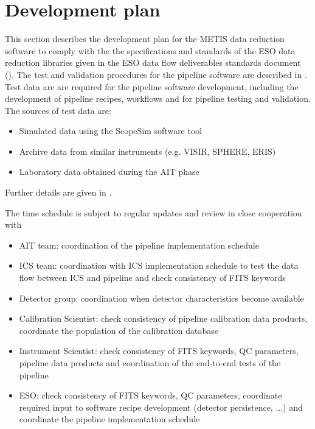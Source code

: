 \clearpage
\section{Development plan}\label{sec:development_plan}

This section describes the development plan for the METIS data reduction software to comply with the the specifications and standards of the ESO data reduction libraries given in the ESO data flow deliverables standards document (\cite{1618}). The test and validation procedures for the pipeline software are described in \cite{DRLVT}. 
Test data are are required for the pipeline software development, including the development of pipeline recipes, workflows and for pipeline testing and validation. The sources of test data are:
\begin{itemize}
    \item Simulated data using the ScopeSim software tool
    \item Archive data from similar instruments (e.g. VISIR, SPHERE, ERIS)
    \item Laboratory data obtained during the AIT phase
\end{itemize}
Further details are given in \cite{DRLVT}.

The time schedule is subject to regular updates and review in close cooperation with

\begin{itemize}
    \item \ac{AIT} team: coordination of the pipeline implementation schedule
    \item \ac{ICS} team: coordination with ICS implementation schedule to test the data flow between ICS and pipeline and check consistency of FITS keywords
    \item Detector group: coordination when detector characteristics become available
    \item Calibration Scientist: check consistency of pipeline calibration data products, coordinate the population of the calibration database
    \item Instrument Scientist: check consistency of FITS keywords, QC parameters, pipeline data products and coordination of the end-to-end tests of the pipeline
    \item ESO: check consistency of FITS keywords, QC parameters, coordinate required input to software recipe development (detector persistence, ...) and coordinate the pipeline implementation schedule
\end{itemize}

